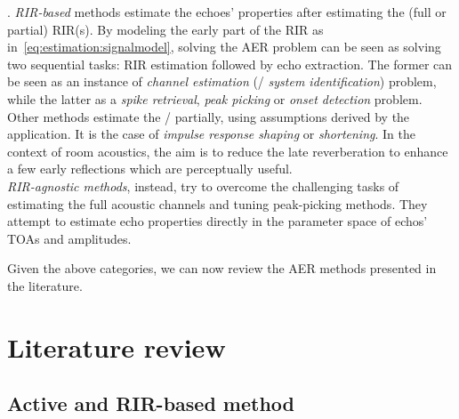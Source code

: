 .
\textit{RIR-based} methods estimate the echoes' properties after estimating the (full or partial) \ac{RIR}(s).
By modeling the early part of the \ac{RIR} as in~\cref{eq:estimation:signalmodel}, solving the \ac{AER} problem can be seen as solving two sequential tasks: \ac{RIR} estimation followed by echo extraction.
The former can be seen as an instance of \textit{channel estimation} (\aka/ \textit{system identification}) problem, while the latter as a \textit{spike retrieval}, \textit{peak picking} or \textit{onset detection} problem.
Other methods estimate the \RIRs/ partially, using assumptions derived by the application.
It is the case of \textit{impulse response shaping} or \textit{shortening}.
In the context of room acoustics, the aim is to reduce the late reverberation to enhance a few early reflections which are perceptually useful.
\\\textit{RIR-agnostic methods}, instead, try to overcome the challenging tasks of estimating the full acoustic channels and tuning peak-picking methods.
They attempt to estimate echo properties directly in the parameter space of echos' \acp{TOA} and amplitudes.

\begin{figure}[h]
    \footnotesize
    \resizebox{\linewidth}{!}{
        
    }
    \vspace{-\baselineskip}\vspace{-\baselineskip}
\end{figure}

\mynewline
Given the above categories, we can now review the \ac{AER} methods presented in the literature.

\section{Literature review}\label{sec:estimation:sota}

\subsection{Active and RIR-based method}\label{subsec:estimation:active_rir}

